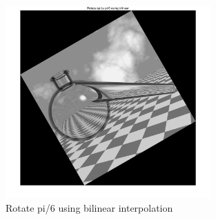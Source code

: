 \documentclass[11pt,oneside]{book}
\begin{document}
\begin{figure}[!htb]
   \centering  
   \includegraphics[width=0.7\textwidth]{images/6/rotate_b.jpg}
   \caption{Rotate pi/6 using bilinear interpolation}
\end{figure}
\end{document}
